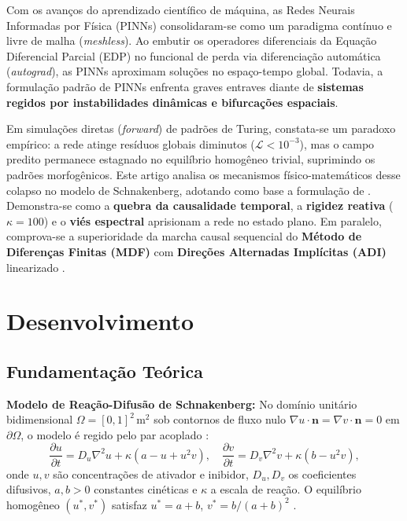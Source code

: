 \documentclass[a4paper, 12pt, twoside]{article}
\begin{document}
Com os avanços do aprendizado científico de máquina, as Redes Neurais Informadas por Física (PINNs) \parencite{raissi2019pinns} consolidaram-se como um paradigma contínuo e livre de malha (\textit{meshless}). Ao embutir os operadores diferenciais da Equação Diferencial Parcial (EDP) no funcional de perda via diferenciação automática (\textit{autograd}), as PINNs aproximam soluções no espaço-tempo global. Todavia, a formulação padrão de PINNs enfrenta graves entraves diante de \textbf{sistemas regidos por instabilidades dinâmicas e bifurcações espaciais}.

Em simulações diretas (\textit{forward}) de padrões de Turing, constata-se um paradoxo empírico: a rede atinge resíduos globais diminutos ($\mathcal{L} < 10^{-3}$), mas o campo predito permanece estagnado no equilíbrio homogêneo trivial, suprimindo os padrões morfogênicos. Este artigo analisa os mecanismos físico-matemáticos desse colapso no modelo de Schnakenberg, adotando como base a formulação de \textcite{pereira2019}. Demonstra-se como a \textbf{quebra da causalidade temporal}, a \textbf{rigidez reativa} ($\kappa = 100$) e o \textbf{viés espectral} aprisionam a rede no estado plano. Em paralelo, comprova-se a superioridade da marcha causal sequencial do \textbf{Método de Diferenças Finitas (MDF)} com \textbf{Direções Alternadas Implícitas (ADI)} linearizado \parencite{pereira2019}.

\section{Desenvolvimento}

\subsection{Fundamentação Teórica}

\textbf{Modelo de Reação-Difusão de Schnakenberg:} No domínio unitário bidimensional $\Omega = [0, 1]^2\,\text{m}^2$ sob contornos de fluxo nulo $\nabla u \cdot \mathbf{n} = \nabla v \cdot \mathbf{n} = 0$ em $\partial\Omega$, o modelo é regido pelo par acoplado \parencite{schnakenberg1979simple, pereira2019}:
\begin{equation}
  \frac{\partial u}{\partial t} = D_u \nabla^2 u + \kappa \left( a - u + u^2 v \right), \quad
  \frac{\partial v}{\partial t} = D_v \nabla^2 v + \kappa \left( b - u^2 v \right), \label{eq:schnak}
\end{equation}
onde $u, v$ são concentrações de ativador e inibidor, $D_u, D_v$ os coeficientes difusivos, $a, b > 0$ constantes cinéticas e $\kappa$ a escala de reação. O equilíbrio homogêneo $(u^*, v^*)$ satisfaz $u^* = a + b$, $v^* = b / (a + b)^2$ \parencite{pereira2019}.
\end{document}
